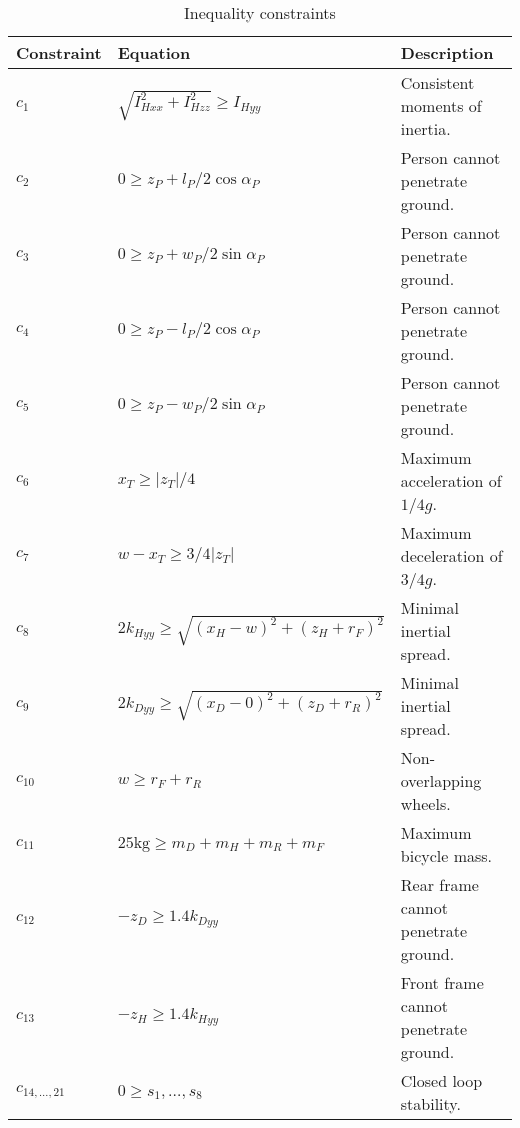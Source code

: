 \documentclass{bmd2019a}
\begin{document}
\begin{table}
  \caption{Inequality constraints}
  \label{tab:inequality-constraints}
  \centering
  \begin{tabular}{lll}
    \toprule
    Constraint & Equation & Description \\
    \midrule
    $c_1$    & $\sqrt{I_{Hxx}^2+I_{Hzz}^2} \geq I_{Hyy}$           & Consistent moments of inertia. \\
    $c_2$    & $0 \geq z_P + l_P/2 \cos{\alpha_P}$                 & Person cannot penetrate ground. \\
    $c_3$    & $0 \geq z_P + w_P/2 \sin{\alpha_P}$                 & Person cannot penetrate ground. \\
    $c_4$    & $0 \geq z_P - l_P/2 \cos{\alpha_P}$                 & Person cannot penetrate ground. \\
    $c_5$    & $0 \geq z_P - w_P/2 \sin{\alpha_P}$                 & Person cannot penetrate ground. \\
    $c_6$    & $x_T \geq |z_T|/4$                                  & Maximum acceleration of $1/4g$. \\
    $c_7$    & $w-x_T \geq 3/4|z_T|$                               & Maximum deceleration of $3/4g$. \\
    $c_8$    & $2k_{Hyy} \geq \sqrt{(x_H - w)^2 + (z_H + r_F)^2}$  & Minimal inertial spread. \\
    $c_9$    & $2k_{Dyy} \geq \sqrt{(x_D - 0)^2 + (z_D + r_R)^2}$  & Minimal inertial spread. \\
    $c_{10}$ & $w \geq r_F +r_R$                                   & Non-overlapping wheels. \\
    $c_{11}$ & $25\si{\kg} \geq m_D + m_H + m_R + m_F$             & Maximum bicycle mass. \\
    $c_{12}$ & $-z_D \geq 1.4 k_{Dyy}$                             & Rear frame cannot penetrate ground. \\
    $c_{13}$ & $-z_H \geq 1.4 k_{Hyy}$                             & Front frame cannot penetrate ground. \\
    $c_{14,\ldots,21}$ & $0 \geq s_1,\ldots,s_8$                   & Closed loop stability. \\
    \bottomrule
  \end{tabular}
\end{table}
\end{document}
